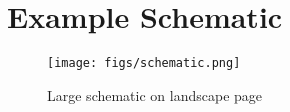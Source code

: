 \chapter{Example Schematic}\label{appendixb}
\begin{sidewaysfigure}[h!]
  \centering
  \texttt{[image: figs/schematic.png]}
  \caption{Large schematic on landscape page}
  \label{fig:sche}
\end{sidewaysfigure}
